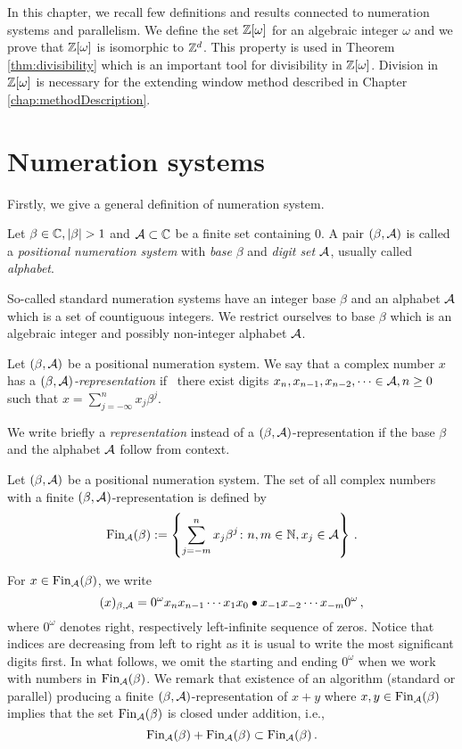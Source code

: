 In this chapter, we recall few definitions and results connected to numeration systems and parallelism. We define the set $\mathbb{Z}[\omega]$ for an algebraic integer $\omega$ and we prove that $\mathbb{Z}[\omega]$ is isomorphic to $\mathbb{Z}^d$. This property is used in Theorem \ref{thm:divisibility} which is an important tool for divisibility in $\mathbb{Z}[\omega]$. Division in $\mathbb{Z}[\omega]$ is necessary for the extending window method described in Chapter \ref{chap:methodDescription}.

\section{Numeration systems}
Firstly, we give a general definition of numeration system.
\begin{defn}
  Let $\beta \in \CC, |\beta|>1$ and $\mathcal{A} \subset \mathbb{C}$ be a finite set containing 0. A pair $(\beta, \mathcal{A})$ is called a \emph{positional numeration system} with \emph{base} $\beta$ and \emph{digit set} $\mathcal{A}$, usually called \emph{alphabet}.
\end{defn}
So-called standard numeration systems have an integer base $\beta$ and an alphabet $\mathcal{A}$ which is a set of countiguous integers. We restrict ourselves to base $\beta$ which is an algebraic integer and possibly non-integer alphabet $\mathcal{A}$. 
\begin{defn}
Let $(\beta, \mathcal{A})$ be a positional numeration system.  We say that a complex number $x$ has a \emph{$(\beta, \mathcal{A})$-representation} if~ there exist digits $x_n,x_{n-1}, x_{n-2},\dots \in\mathcal{A}, n\geq 0$ such that $x=\sum_{j=-\infty}^n x_j \beta^j$.
\end{defn}
 We write briefly a \emph{representation} instead of a $(\beta, \mathcal{A})$-representation if the base $\beta$ and the alphabet $\mathcal{A}$ follow from context. 

\begin{defn}
Let $(\beta, \mathcal{A})$ be a positional numeration system. The set of all complex numbers with a finite $(\beta, \mathcal{A})$-representation is defined by
$$
    \text{Fin}_{\mathcal{A}}(\beta):=\left\{\sum_{j=-m}^n x_j \beta^j\colon n, m \in \mathbb{N}, x_j \in \mathcal{A} \right\}\,.
$$
\end{defn}
   
For  $x\in\text{Fin}_{\mathcal{A}}(\beta)$, we write 
$$
(x)_{\beta,\mathcal{A}}= 0^\omega x_n x_{n-1}\cdots x_1 x_0 \bullet x_{-1} x_{-2} \cdots x_{-m} 0^\omega\,,
$$ 
where $0^\omega$ denotes right, respectively left-infinite sequence of zeros. Notice that indices are decreasing from left to right as it is usual to write the most significant digits first. In what follows, we omit the starting and ending $0^\omega$ when we work with numbers in $\text{Fin}_{\mathcal{A}}(\beta)$. We remark that existence of an algorithm (standard or parallel) producing a finite $(\beta,\mathcal{A})$-representation of $x+y$ where $x,y\in\text{Fin}_{\mathcal{A}}(\beta)$ implies that the set $\text{Fin}_{\mathcal{A}}(\beta)$ is closed under addition, i.e.,
$$
\text{Fin}_{\mathcal{A}}(\beta) + \text{Fin}_{\mathcal{A}}(\beta) \subset \text{Fin}_{\mathcal{A}}(\beta)\,.
$$ 

